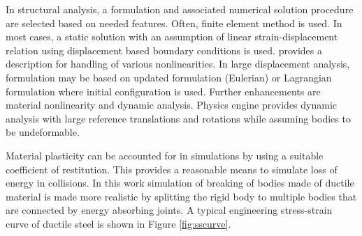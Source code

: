 \begin {table}
\label{tab:constraintParameters} 
\end {table}

In structural analysis, a formulation and associated numerical solution procedure are selected 
based on needed features.
Often,  finite element method is used.
In most cases, a static solution with an assumption of linear strain-displacement relation
using displacement based boundary conditions is used.
\cite{bathe-1975} provides a description for handling of various nonlinearities.
In large displacement analysis, formulation may be based on updated formulation (Eulerian) or
Lagrangian formulation where initial configuration is used.
Further enhancements are material nonlinearity and dynamic analysis.
Physics engine provides dynamic analysis with large reference translations and rotations
while assuming bodies to be undeformable.

Material plasticity can be accounted for in simulations by using a suitable coefficient of restitution.
This provides a reasonable means to simulate loss of energy in collisions.
In this work simulation of breaking of bodies made of ductile material is made more realistic 
by splitting the rigid body
to multiple bodies that are connected by energy absorbing joints.
A typical engineering stress-strain curve of ductile steel is shown in Figure \ref{fig:sscurve}.

